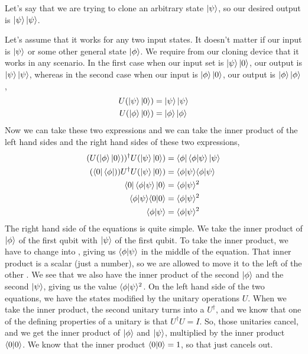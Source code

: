 Let's say that we are trying to clone an arbitrary state $\left| \psi \right\rangle$, so our desired output is $\left| \psi \right\rangle\left| \psi \right\rangle$.

Let's assume that it works for any two input states. It doesn't matter if our input is $\left| \psi \right\rangle$ or some other general state $\left| \phi \right\rangle$. We require from our cloning device that it works in any scenario. In the first case when our input set is $\left| \psi \right\rangle\left| 0 \right\rangle$, our output is $\left| \psi \right\rangle \left| \psi \right\rangle$, whereas in the second case when our input is $\left| \phi \right\rangle\left| 0 \right\rangle$, our output is $\left| \phi \right\rangle\left| \phi \right\rangle$,
\begin{equation}
\begin{aligned}
U(\left| \psi \right\rangle\left| 0 \right\rangle) &=\left| \psi \right\rangle\left| \psi \right\rangle \\
U(\left| \phi \right\rangle\left| 0 \right\rangle) &=\left| \phi \right\rangle\left| \phi \right\rangle
\end{aligned}
\end{equation}
Now we can take these two expressions and we can take the inner product of the left hand sides and the right hand sides of these two expressions,
\begin{equation}
\begin{aligned}
(U(\left| \phi \right\rangle\left| 0 \right\rangle))^{\dagger}U(\left| \psi \right\rangle\left| 0 \right\rangle) &= \left\langle \phi \right|\langle \phi|\psi \rangle\left| \psi \right\rangle \\
(\left\langle 0 \right|\left\langle \phi \right|))U^{\dagger}U(\left| \psi \right\rangle\left| 0 \right\rangle) &= \langle \phi|\psi \rangle\langle \phi|\psi \rangle \\
\left\langle 0 \right|\langle \phi|\psi \rangle\left| 0 \right\rangle &= \langle \phi|\psi \rangle^2\\
\langle \phi|\psi \rangle\langle 0|0 \rangle &= \langle \phi|\psi \rangle^2\\
\langle \phi|\psi \rangle &= \langle \phi|\psi \rangle^2
\end{aligned}
\end{equation}
The right hand side of the equations is quite simple. We take the inner product of $\left| \phi \right\rangle$ of the first qubit with $\left| \psi \right\rangle$ of the first qubit. To take the inner product, we have to change \ket{\phi} into \bra{\phi}, giving us $\langle \phi|\psi \rangle$ in the middle of the equation. That inner product is a scalar (just a number), so we are allowed to move it to the left of the other \ket{\phi}. We see that we also have the inner product of the second $\left| \phi \right\rangle$ and the second $\left| \psi \right\rangle$, giving us the value $\langle \phi|\psi \rangle^2$. On the left hand side of the two equations, we have the states modified by the unitary operations $U$.  When we take the inner product, the second unitary turns into a $U^\dagger$, and we know that one of the defining properties of a unitary is that $U^\dagger U = I$. So, those unitaries cancel, and we get the inner product of $\left| \phi \right\rangle$ and $\left| \psi \right\rangle$, multiplied by the inner product $\langle 0|0 \rangle$. We know that the inner product $\langle 0|0 \rangle = 1$, so that just cancels out.

